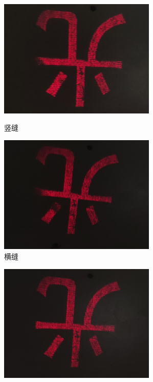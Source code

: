 \documentclass[11pt]{article}
\begin{document}
\begin{enumerate}
\begin{figure}[H]
    \end{figure}
    \begin{figure}[H]
        \centering
        \begin{minipage}[t]{0.49\linewidth}
            \centering
            \includegraphics[width=7.5cm]{Fig/5-竖缝.jpg}
            \caption{竖缝}
        \end{minipage}
        \begin{minipage}[t]{0.49\linewidth}
            \centering
            \includegraphics[width=7.5cm]{Fig/5-横缝.jpg}
            \caption{横缝}
        \end{minipage}
    \end{figure}
    \begin{figure}[H]
        \centering
        \begin{minipage}[t]{0.49\linewidth}
            \centering
            \includegraphics[width=7.5cm]{Fig/5-左斜.jpg}

\end{minipage}
\end{figure}
\end{enumerate}
\end{document}
